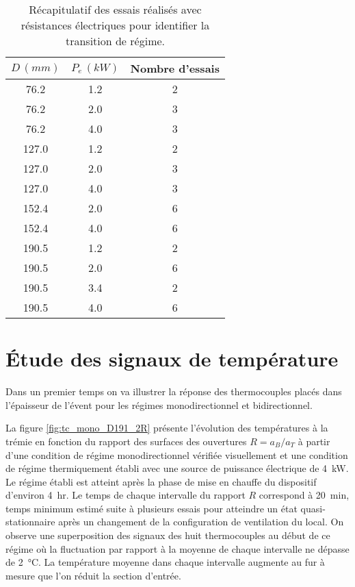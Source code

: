 \begin{table}[H]
\centering
\caption{Récapitulatif des essais réalisés avec résistances électriques pour identifier la transition de régime.}
\setlength\extrarowheight{0.5pt}
\begin{tabular}{c c c}
\hline
$D\,(\si{mm})$ & $P_e\,(\si{kW})$ & Nombre d'essais \rule{0pt}{14pt}\\[0.5ex]
\hline
76.2 & 1.2 & 2 \\
76.2 & 2.0 & 3 \\
76.2 & 4.0 & 3 \\
\midrule[0.1pt]  
127.0 & 1.2 & 2 \\ 
127.0 & 2.0 & 3 \\
127.0 & 4.0 & 3 \\
\midrule[0.1pt]  
152.4 & 2.0 & 6 \\ 
152.4 & 4.0 & 6 \\ 
\midrule[0.1pt]  
190.5 & 1.2 & 2 \\ 
190.5 & 2.0 & 6 \\ 
190.5 & 3.4 & 2 \\
190.5 & 4.0 & 6 \\  
\hline
\end{tabular}
\label{tab:essais_resist}
\end{table}

\section{Étude des signaux de température}
Dans un premier temps on va illustrer la réponse des thermocouples placés dans l'épaisseur de l'évent pour les régimes monodirectionnel et bidirectionnel.

La figure \ref{fig:tc_mono_D191_2R} présente l'évolution des températures à la trémie en fonction du rapport des surfaces des ouvertures $R=a_B/a_T$ à partir d'une condition de régime monodirectionnel vérifiée visuellement et une condition de régime thermiquement établi avec une source de puissance électrique de \SI{4}{kW}. Le régime établi est atteint après la phase de mise en chauffe du dispositif d'environ \SI{4}{hr}. Le temps de chaque intervalle du rapport $R$ correspond à \SI{20}{min}, temps minimum estimé suite à plusieurs essais pour atteindre un état quasi-stationnaire après un changement de la configuration de ventilation du local. On observe une superposition des signaux des huit thermocouples au début de ce régime où la fluctuation par rapport à la moyenne de chaque intervalle ne dépasse de \SI{2}{\celsius}. La température moyenne dans chaque intervalle augmente au fur à mesure que l'on réduit la section d'entrée.

